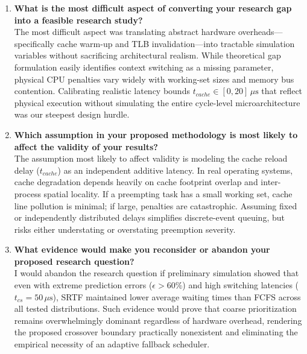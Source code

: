 \documentclass[11pt]{article}
\newcommand{\topicTitle}[1]{
    \vspace{0.35em}\noindent{\fontsize{11}{13.2}\selectfont \textbf{#1}}\par\vspace{0.2em}
}
\begin{document}
\vspace{0.4em}
\topicTitle{Student 1: Gaurav Acharya (MT26MCS024)}

\begin{enumerate}[label=\textbf{\arabic*.}, leftmargin=1.4em, itemsep=0.6em, parsep=0pt]
    \item \textbf{What is the most difficult aspect of converting your research gap into a feasible research study?} \\
    The most difficult aspect was translating abstract hardware overheads---specifically cache warm-up and TLB invalidation---into tractable simulation variables without sacrificing architectural realism. While theoretical gap formulation easily identifies context switching as a missing parameter, physical CPU penalties vary widely with working-set sizes and memory bus contention. Calibrating realistic latency bounds $t_{cache} \in [0, 20]\,\mu\text{s}$ that reflect physical execution without simulating the entire cycle-level microarchitecture was our steepest design hurdle.

    \item \textbf{Which assumption in your proposed methodology is most likely to affect the validity of your results?} \\
    The assumption most likely to affect validity is modeling the cache reload delay ($t_{cache}$) as an independent additive latency. In real operating systems, cache degradation depends heavily on cache footprint overlap and inter-process spatial locality. If a preempting task has a small working set, cache line pollution is minimal; if large, penalties are catastrophic. Assuming fixed or independently distributed delays simplifies discrete-event queuing, but risks either understating or overstating preemption severity.

    \item \textbf{What evidence would make you reconsider or abandon your proposed research question?} \\
    I would abandon the research question if preliminary simulation showed that even with extreme prediction errors ($\epsilon > 60\%$) and high switching latencies ($t_{cs} = 50\,\mu\text{s}$), SRTF maintained lower average waiting times than FCFS across all tested distributions. Such evidence would prove that coarse prioritization remains overwhelmingly dominant regardless of hardware overhead, rendering the proposed crossover boundary practically nonexistent and eliminating the empirical necessity of an adaptive fallback scheduler.


\end{enumerate}
\end{document}
